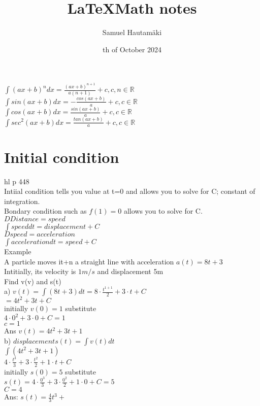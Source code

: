 \documentclass{article}
\title{\LaTeX Math notes}
\author{Samuel Hautamäki}
\date{th of October 2024}
\begin{document}
  \maketitle
   
  $\int (ax+b)^ndx=\frac{(ax+b)^{n+1}}{a(n+1)}+c, c,n\in\mathbb{R}$\\
  $\int sin(ax+b)dx=-\frac{cos(ax+b)}{a}+c ,c\in\mathbb{R}$\\
  $\int cos(ax+b)dx=\frac{sin(ax+b)}{a}+c, c\in\mathbb{R}$\\
  $\int sec^2(ax+b)dx=\frac{tan(ax+b)}{a}+c,c\in\mathbb{R}$

  \section{Initial condition}
  hl p 448\\
  Intiial condition tells you value at t=0 and allows you to solve for C; constant of integration.\\
  Bondary condition such as $f(1)=0$ allows you to solve for C.\\
  $D Distance = speed$\\
  $\int speed dt=displacement +C$\\
  $D speed = acceleration$\\
  $\int acceleration dt=speed + C$\\
  Example\\
  A particle moves it+n a straight line with acceleration $a(t)=8t+3$\\
  Intitially, its velocity is $1 m/s$ and displacement 5m\\
  Find v(v) and s(t)\\
  a) $v(t)=\int (8t+3)dt = 8\cdot\frac{t^{1+1}}{2}+3\cdot t+C$\\
  $=4t^2+3t+C$\\
  initially $v(0)=1$ substitute\\
  $4\cdot 0^2+3\cdot 0+C=1$\\
  $c=1$\\
  Ans $v(t)=4t^2+3t+1$\\
  b) $displacement s(t)=\int v(t) dt$\\
  $\int(4t^2+3t+1)$\\
  $4\cdot\frac{t^3}{3}+3\cdot\frac{t^2}{2}+1\cdot t+C$\\
  initially $s(0)=5$ substitute\\
  $s(t)=4\cdot\frac{0^3}{3}+3\cdot\frac{0^2}{2}+1\cdot0+C=5$\\
  $C=4$\\
  Ans: $s(t)=\frac{4}{3}t^3+\frac{}{}$
\end{document}
